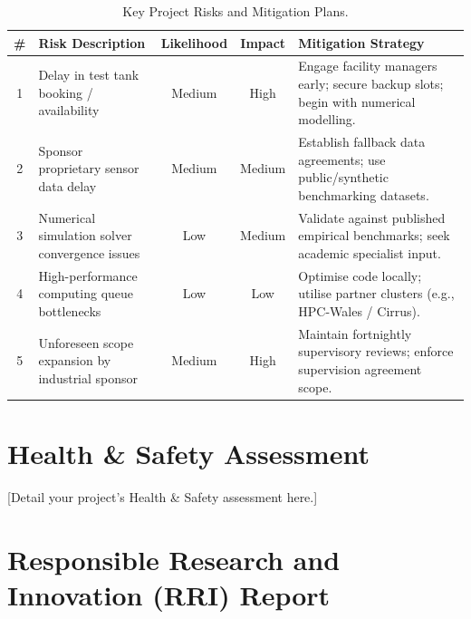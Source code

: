 \documentclass[year1]{../idcore-ar}
\begin{document}
\begin{table}[htbp]
\centering
\small
\renewcommand{\arraystretch}{1.3}
\begin{tabularx}{\linewidth}{|c|>{\raggedright\arraybackslash}p{4cm}|c|c|>{\raggedright\arraybackslash}X|}
  \hline
  \rowcolor{idcorelight}
  \textbf{\#} & \textbf{Risk Description} & \textbf{Likelihood} & \textbf{Impact} & \textbf{Mitigation Strategy} \\ \hline
  1 & Delay in test tank booking / availability & Medium & High & Engage facility managers early; secure backup slots; begin with numerical modelling. \\ \hline
  2 & Sponsor proprietary sensor data delay & Medium & Medium & Establish fallback data agreements; use public/synthetic benchmarking datasets. \\ \hline
  3 & Numerical simulation solver convergence issues & Low & Medium & Validate against published empirical benchmarks; seek academic specialist input. \\ \hline
  4 & High-performance computing queue bottlenecks & Low & Low & Optimise code locally; utilise partner clusters (e.g., HPC-Wales / Cirrus). \\ \hline
  5 & Unforeseen scope expansion by industrial sponsor & Medium & High & Maintain fortnightly supervisory reviews; enforce supervision agreement scope. \\ \hline
\end{tabularx}
\caption{Key Project Risks and Mitigation Plans.}
\end{table}


\section{Health \& Safety Assessment}

[Detail your project's Health \& Safety assessment here.]


\section{Responsible Research and Innovation (RRI) Report}
\end{document}
